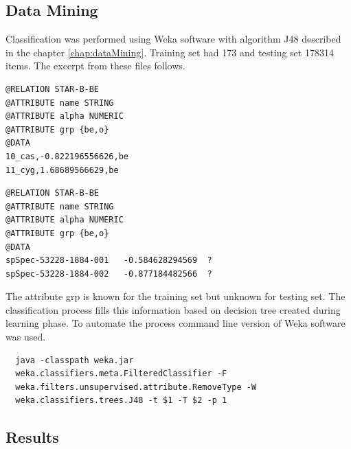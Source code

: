 



\subsection{Data Mining}
Classification was performed using Weka software with algorithm J48
described in the chapter \ref{chap:dataMining}. Training set had 173
and testing set 178314 items. The excerpt from these files follows.

\begin{lstlisting}
@RELATION STAR-B-BE
@ATTRIBUTE name STRING
@ATTRIBUTE alpha NUMERIC
@ATTRIBUTE grp {be,o}
@DATA
10_cas,-0.822196556626,be
11_cyg,1.68689566629,be
\end{lstlisting}

\begin{lstlisting}
@RELATION STAR-B-BE
@ATTRIBUTE name STRING
@ATTRIBUTE alpha NUMERIC
@ATTRIBUTE grp {be,o}
@DATA	 
spSpec-53228-1884-001	-0.584628294569	 ?
spSpec-53228-1884-002	-0.877184482566	 ?
\end{lstlisting}

The attribute \textrm{grp} is known for the training set but unknown
for testing set. The classification process fills this information
based on decision tree created during learning phase. To automate the
process command line version of Weka software was used.

\begin{lstlisting}
  java -classpath weka.jar
  weka.classifiers.meta.FilteredClassifier -F
  weka.filters.unsupervised.attribute.RemoveType -W
  weka.classifiers.trees.J48 -t $1 -T $2 -p 1
\end{lstlisting}

\subsection{Results}


